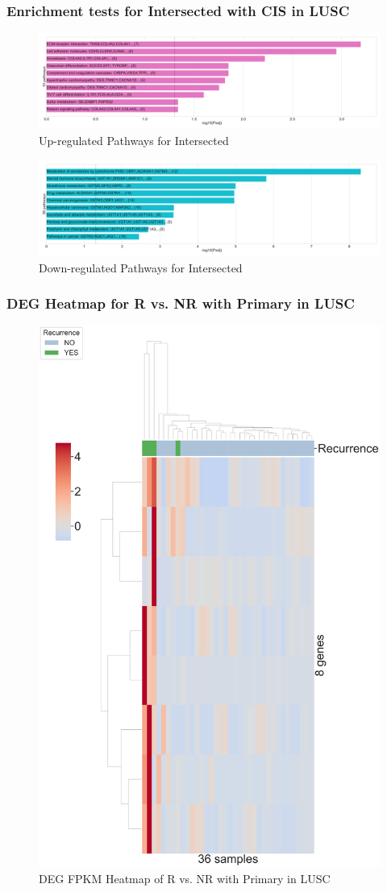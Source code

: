 \documentclass{beamer}
\begin{document}
    \begin{frame}
        \frametitle{Enrichment tests for Intersected with CIS in LUSC}

        \begin{figure}
            \includegraphics[width=0.8 \linewidth]{figures/DEG/Enrichment/STAR.FPKM.SQC-CIS.Both.Up.KEGG.pdf}
            \caption{Up-regulated Pathways for Intersected}
        \end{figure}

        \begin{figure}
            \includegraphics[width=0.8 \linewidth]{figures/DEG/Enrichment/STAR.FPKM.SQC-CIS.Both.Down.KEGG.pdf}
            \caption{Down-regulated Pathways for Intersected}
        \end{figure}
    \end{frame}

    \begin{frame}
        \frametitle{DEG Heatmap for R vs. NR with Primary in LUSC}

        \begin{figure}
            \includegraphics[width=0.35 \linewidth]{figures/DEG/Cluster/STAR.FPKM.SQC.Primary.Recur.pdf}
            \caption{DEG FPKM Heatmap of R vs. NR with Primary in LUSC}
        \end{figure}
    \end{frame}
\end{document}
